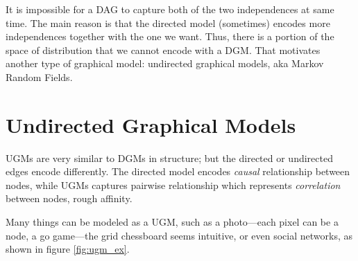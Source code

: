 \documentclass[twoside]{article}
\begin{document}
It is impossible for a DAG to capture both of the two independences at same time. The main reason is that the directed model (sometimes) encodes more independences together with the one we want. Thus, there is a portion of the space of distribution that we cannot encode with a DGM. That motivates another type of graphical model: undirected graphical models, aka Markov Random Fields.

\section{Undirected Graphical Models}

UGMs are very similar to DGMs in structure; but the directed or undirected edges encode differently. The directed model encodes \emph{causal} relationship between nodes, while UGMs captures pairwise relationship which represents \emph{correlation} between nodes, rough affinity.

Many things can be modeled as a UGM, such as a photo---each pixel can be a node, a go game---the grid chessboard seems intuitive, or even social networks, as shown in figure \ref{fig:ugm_ex}.
\end{document}
